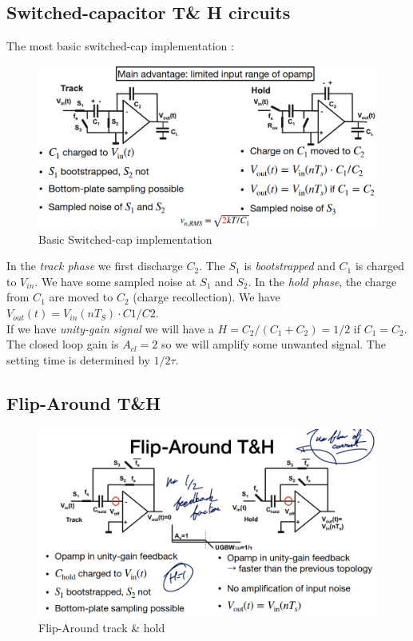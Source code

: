 \documentclass{report}
\begin{document}
\subsection{Switched-capacitor T\& H circuits}

The most basic switched-cap implementation : 

\begin{figure}[H]
    \centering
    \includegraphics[width=1\linewidth]{img/basic_th_switched_cap.png}
    \caption{Basic Switched-cap implementation}
    \label{fig:basic-sc-label}
\end{figure}

In the \textit{track phase} we first discharge $C_2$. The $S_1$ is \textit{bootstrapped} and $C_1$ is charged to $V_{in}$. We have some sampled noise at $S_1$ and $S_2$. In the \textit{hold phase}, the charge from $C_1$ are moved to $C_2$ (charge recollection). We have $V_{out}(t) = V_{in}(nT_S) \cdot C1/C2$.\\

If we have \textit{unity-gain signal} we will have a $H = C_2/(C_1+C_2) = 1/2$ if $C_1 = C_2$. The closed loop gain is $A_{cl} = 2$ so we will amplify some unwanted signal. The setting time is determined by $1/2 \tau$.

\subsection{Flip-Around T\&H}

\begin{figure}[H]
    \centering
    \includegraphics[width=0.75\linewidth]{img/Flip_around.png}
    \caption{Flip-Around track \& hold}
    \label{fig:flip-around-label}
\end{figure}
\end{document}
